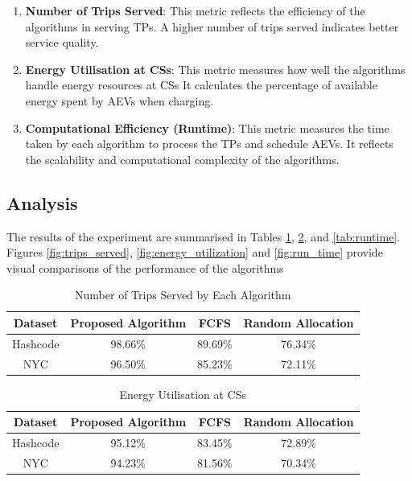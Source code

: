 \begin{enumerate}
    \item \textbf{Number of Trips Served}: This metric reflects the efficiency of the algorithms in serving TPs. A higher number of trips served indicates better service quality.

    \item \textbf{Energy Utilisation at CSs}: This metric measures how well the algorithms handle energy resources at CSs It calculates the percentage of available energy spent by AEVs when charging.

    \item \textbf{Computational Efficiency (Runtime)}: This metric measures the time taken by each algorithm to process the TPs and schedule AEVs. It reflects the scalability and computational complexity of the algorithms.
\end{enumerate}


\subsection{Analysis}
The results of the experiment are summarised in Tables \ref{tab:trips_served}, \ref{tab:energy_utilization}, and \ref{tab:runtime}. Figures \ref{fig:trips_served}, \ref{fig:energy_utilization} and \ref{fig:run_time} provide visual comparisons of the performance of the algorithms

\begin{table}[htbp]
\caption{Number of Trips Served by Each Algorithm}
\centering
\begin{tabular}{|c|c|c|c|}
\hline
\textbf{Dataset} & \textbf{Proposed Algorithm} & \textbf{FCFS} & \textbf{Random Allocation} \\
\hline
Hashcode & 98.66\% & 89.69\% & 76.34\% \\
NYC & 96.50\% & 85.23\% & 72.11\% \\
\hline
\end{tabular}
\label{tab:trips_served}
\end{table}

\begin{table}[htbp]
\caption{Energy Utilisation at CSs}
\centering
\begin{tabular}{|c|c|c|c|}
\hline
\textbf{Dataset} & \textbf{Proposed Algorithm} & \textbf{FCFS} & \textbf{Random Allocation} \\
\hline
Hashcode & 95.12\% & 83.45\% & 72.89\% \\
NYC & 94.23\% & 81.56\% & 70.34\% \\
\hline
\end{tabular}
\label{tab:energy_utilization}
\end{table}

